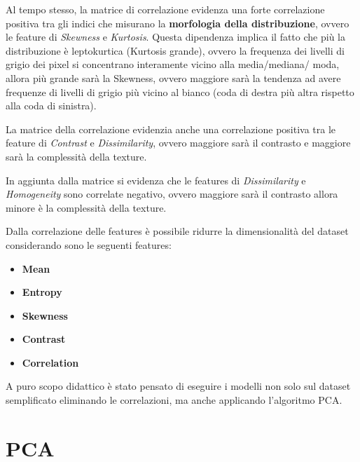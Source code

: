 Al tempo stesso, la matrice di correlazione evidenza una forte correlazione positiva
tra gli indici che misurano la \textbf{morfologia della distribuzione}, ovvero
le feature di \textit{Skewness} e \textit{Kurtosis}. Questa dipendenza implica il
fatto che più la distribuzione è leptokurtica (Kurtosis grande), ovvero la frequenza
dei livelli di grigio dei pixel si concentrano interamente vicino alla media/mediana/
moda, allora più grande sarà la Skewness, ovvero maggiore sarà la tendenza ad avere
frequenze di livelli di grigio più vicino al bianco (coda di destra più altra rispetto
alla coda di sinistra).

La matrice della correlazione evidenzia anche una correlazione positiva tra le
feature di \textit{Contrast} e \textit{Dissimilarity}, ovvero maggiore sarà il
contrasto e maggiore sarà la complessità della texture.

In aggiunta dalla matrice si evidenza che le features di \textit{Dissimilarity}
e \textit{Homogeneity} sono correlate negativo, ovvero maggiore sarà il contrasto
allora minore è la complessità della texture.

Dalla correlazione delle features è possibile ridurre la dimensionalità del dataset
considerando sono le seguenti features:
\begin{itemize}
    \item \textbf{Mean}
    \item \textbf{Entropy}
    \item \textbf{Skewness}
    \item \textbf{Contrast}
    \item \textbf{Correlation}
\end{itemize}
A puro scopo didattico è stato pensato di eseguire i modelli non solo sul dataset
semplificato eliminando le correlazioni, ma anche applicando l'algoritmo PCA.

\section{PCA}
